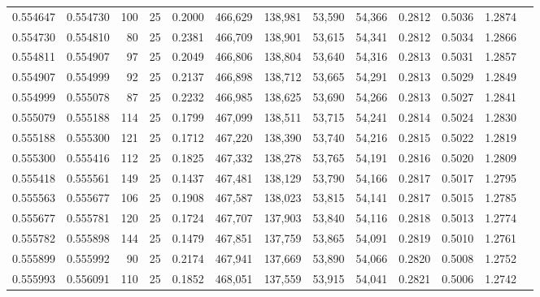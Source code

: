 \begin{tabular}{rrrrrrrrrrrrr}
0.554647 & 0.554730 &   100 &  25 &                                     0.2000 & 466,629 & 138,981 &  53,590 &  54,366 & 0.2812 & 0.5036 & 1.2874 \\
0.554730 & 0.554810 &    80 &  25 &                                     0.2381 & 466,709 & 138,901 &  53,615 &  54,341 & 0.2812 & 0.5034 & 1.2866 \\
0.554811 & 0.554907 &    97 &  25 &                                     0.2049 & 466,806 & 138,804 &  53,640 &  54,316 & 0.2813 & 0.5031 & 1.2857 \\
0.554907 & 0.554999 &    92 &  25 &                                     0.2137 & 466,898 & 138,712 &  53,665 &  54,291 & 0.2813 & 0.5029 & 1.2849 \\
0.554999 & 0.555078 &    87 &  25 &                                     0.2232 & 466,985 & 138,625 &  53,690 &  54,266 & 0.2813 & 0.5027 & 1.2841 \\
0.555079 & 0.555188 &   114 &  25 &                                     0.1799 & 467,099 & 138,511 &  53,715 &  54,241 & 0.2814 & 0.5024 & 1.2830 \\
0.555188 & 0.555300 &   121 &  25 &                                     0.1712 & 467,220 & 138,390 &  53,740 &  54,216 & 0.2815 & 0.5022 & 1.2819 \\
0.555300 & 0.555416 &   112 &  25 &                                     0.1825 & 467,332 & 138,278 &  53,765 &  54,191 & 0.2816 & 0.5020 & 1.2809 \\
0.555418 & 0.555561 &   149 &  25 &                                     0.1437 & 467,481 & 138,129 &  53,790 &  54,166 & 0.2817 & 0.5017 & 1.2795 \\
0.555563 & 0.555677 &   106 &  25 &                                     0.1908 & 467,587 & 138,023 &  53,815 &  54,141 & 0.2817 & 0.5015 & 1.2785 \\
0.555677 & 0.555781 &   120 &  25 &                                     0.1724 & 467,707 & 137,903 &  53,840 &  54,116 & 0.2818 & 0.5013 & 1.2774 \\
0.555782 & 0.555898 &   144 &  25 &                                     0.1479 & 467,851 & 137,759 &  53,865 &  54,091 & 0.2819 & 0.5010 & 1.2761 \\
0.555899 & 0.555992 &    90 &  25 &                                     0.2174 & 467,941 & 137,669 &  53,890 &  54,066 & 0.2820 & 0.5008 & 1.2752 \\
0.555993 & 0.556091 &   110 &  25 &                                     0.1852 & 468,051 & 137,559 &  53,915 &  54,041 & 0.2821 & 0.5006 & 1.2742 \\

\end{tabular}
